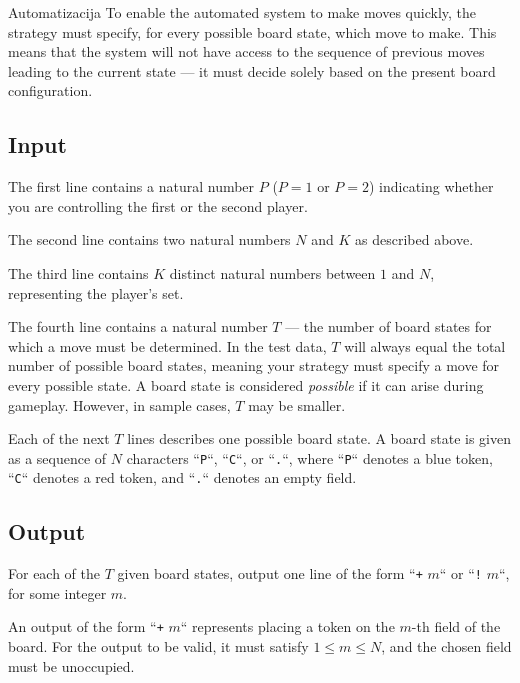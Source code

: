 \begin{statement}[
  problempoints=100,
  timelimit=6 seconds,
  memorylimit=512 MiB,
]{Automatizacija}
To enable the automated system to make moves quickly,  
the strategy must specify, for every possible board state, which move to make.  
This means that the system will not have access to the sequence of previous moves 
leading to the current state — it must decide solely based on the present board configuration.

\subsection*{Input}

The first line contains a natural number $P$ ($P=1$ or $P=2$) indicating 
whether you are controlling the first or the second player.

The second line contains two natural numbers $N$ and $K$ as described above.

The third line contains $K$ distinct natural numbers between $1$ and $N$, 
representing the player's set.

The fourth line contains a natural number $T$ — the number of board states 
for which a move must be determined.  
In the test data, $T$ will always equal the total number of possible board states, 
meaning your strategy must specify a move for every possible state.  
A board state is considered \textit{possible} if it can arise during gameplay.  
However, in sample cases, $T$ may be smaller.

Each of the next $T$ lines describes one possible board state.  
A board state is given as a sequence of $N$ characters “\texttt{P}“, “\texttt{C}“, or “\texttt{.}“, 
where “\texttt{P}“ denotes a blue token, “\texttt{C}“ denotes a red token, 
and “\texttt{.}“ denotes an empty field.

\subsection*{Output}

For each of the $T$ given board states, output 
one line of the form “\texttt{+} $m$“ or “\texttt{!} $m$“, for some integer $m$.
\vspace{-0.15em}

An output of the form “\texttt{+} $m$“ represents placing a token 
on the $m$-th field of the board.  
For the output to be valid, it must satisfy $1 \leq m \leq N$, 
and the chosen field must be unoccupied.


\end{statement}
